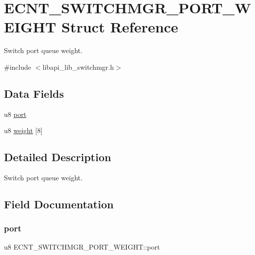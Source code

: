 \hypertarget{structECNT__SWITCHMGR__PORT__WEIGHT}{}\section{E\+C\+N\+T\+\_\+\+S\+W\+I\+T\+C\+H\+M\+G\+R\+\_\+\+P\+O\+R\+T\+\_\+\+W\+E\+I\+G\+HT Struct Reference}
\label{structECNT__SWITCHMGR__PORT__WEIGHT}


Switch port queue weight.  




{\ttfamily \#include $<$libapi\+\_\+lib\+\_\+switchmgr.\+h$>$}

\subsection*{Data Fields}
\begin{DoxyCompactItemize}
\item 
u8 \hyperlink{structECNT__SWITCHMGR__PORT__WEIGHT_ab2900a7b8285ef78c3318c1dbdd0b7dd}{port}
\item 
u8 \hyperlink{structECNT__SWITCHMGR__PORT__WEIGHT_abd9ace5d68ad37a5e6523b5c2d3883e9}{weight} \mbox{[}8\mbox{]}
\end{DoxyCompactItemize}


\subsection{Detailed Description}
Switch port queue weight. 

\subsection{Field Documentation}
\mbox{\label{structECNT__SWITCHMGR__PORT__WEIGHT_ab2900a7b8285ef78c3318c1dbdd0b7dd}} 
\subsubsection{\texorpdfstring{port}{port}}
{\footnotesize\ttfamily u8 E\+C\+N\+T\+\_\+\+S\+W\+I\+T\+C\+H\+M\+G\+R\+\_\+\+P\+O\+R\+T\+\_\+\+W\+E\+I\+G\+H\+T\+::port}

